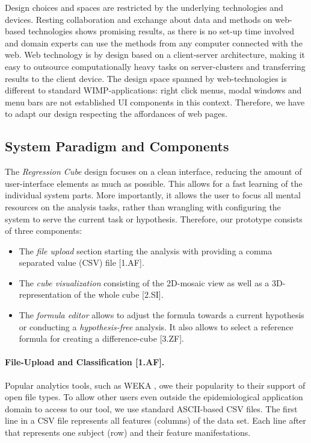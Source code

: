 \documentclass[journal]{style/vgtc} 			          %
\newcommand{\com}[1]{\textcolor{orange}{\uline{#1}}}
\begin{document}
\noindent Design choices and spaces are restricted by the underlying technologies and devices.
Resting collaboration and exchange about data and methods on web-based technologies shows promising results, as there is no set-up time involved and domain experts can use the methods from any computer connected with the web.
Web technology is by design based on a client-server architecture, making it easy to outsource computationally heavy tasks on server-clusters and transferring results to the client device.
The design space spanned by web-technologies is different to standard WIMP-applications: right click menus, modal windows and menu bars are not established UI components in this context.
Therefore, we have to adapt our design respecting the affordances of web pages.
\subsection{System Paradigm and Components}
The \emph{Regression Cube} design focuses on a clean interface, reducing the amount of user-interface elements as much as possible.
This allows for a fast learning of the individual system parts.
More importantly, it allows the user to focus all mental resources on the analysis tasks, rather than wrangling with configuring the system to serve the current task or hypothesis.
Therefore, our prototype consists of three components:
\begin{itemize}
	\item The \emph{file upload} section starting the analysis with providing a comma separated value (CSV) file [1.AF].
	\item The \emph{cube visualization} consisting of the 2D-mosaic view as well as a 3D-representation of the whole cube [2.SI].
	\item The \emph{formula editor} allows to adjust the formula towards a current hypothesis or conducting a \emph{hypothesis-free} analysis.
	It also allows to select a reference formula for creating a difference-cube [3.ZF].
\end{itemize}
\paragraph{File-Upload and Classification [1.AF].}
Popular analytics tools, such as WEKA \cite{WEKA}, owe their popularity to their support of open file types.
To allow other users even outside the epidemiological application domain to access to our tool, we use standard ASCII-based CSV files.
The first line in a CSV file represents all features (columns) of the data set.
Each line after that represents one subject (row) and their feature manifestations.
\end{document}
